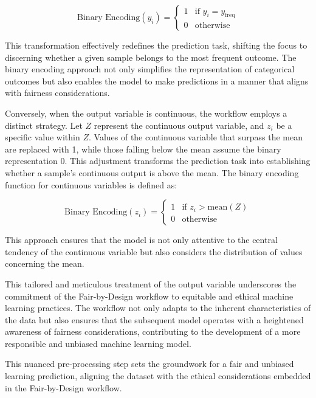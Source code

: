\begin{enumerate}
    \[
    \text{Binary Encoding}(y_i) = \begin{cases} 
    1 & \text{if } y_i = y_{\text{freq}} \\ 
    0 & \text{otherwise}
    \end{cases}
    \]

    This transformation effectively redefines the prediction task, shifting the focus to discerning whether a given sample belongs to the most frequent outcome. The binary encoding approach not only simplifies the representation of categorical outcomes but also enables the model to make predictions in a manner that aligns with fairness considerations.


    Conversely, when the output variable is continuous, the workflow employs a distinct strategy. Let $Z$ represent the continuous output variable, and $z_i$ be a specific value within $Z$. Values of the continuous variable that surpass the mean are replaced with 1, while those falling below the mean assume the binary representation 0. This adjustment transforms the prediction task into establishing whether a sample's continuous output is above the mean. The binary encoding function for continuous variables is defined as:

    \[
    \text{Binary Encoding}(z_i) = \begin{cases} 
    1 & \text{if } z_i > \text{mean}(Z) \\ 
    0 & \text{otherwise}
    \end{cases}
    \]

    This approach ensures that the model is not only attentive to the central tendency of the continuous variable but also considers the distribution of values concerning the mean.

    This tailored and meticulous treatment of the output variable underscores the commitment of the Fair-by-Design workflow to equitable and ethical machine learning practices. The workflow not only adapts to the inherent characteristics of the data but also ensures that the subsequent model operates with a heightened awareness of fairness considerations, contributing to the development of a more responsible and unbiased machine learning model.

\end{enumerate}

This nuanced pre-processing step sets the groundwork for a fair and unbiased learning prediction, aligning the dataset with the ethical considerations embedded in the Fair-by-Design workflow.

